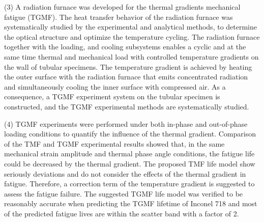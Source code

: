 (3) A radiation furnace was developed for the thermal gradients mechanical fatigue (TGMF). The heat transfer behavior of the radiation furnace was systematically studied by the experimental and analytical methods, to determine the optical structure and optimize the temperature cycling. The radiation furnace together with the loading, and cooling subsystems enables a cyclic and at the same time thermal and mechanical load with controlled temperature gradients on the wall of tubular specimens. The temperature gradient is achieved by heating the outer surface with the radiation furnace that emits concentrated radiation and simultaneously cooling the inner surface with compressed air. As a consequence, a TGMF experiment system on the tubular specimen is constructed, and the TGMF experimental methods are systematically studied. 

(4) TGMF experiments were performed under both in-phase and out-of-phase loading conditions to quantify the influence of the thermal gradient. Comparison of the TMF and TGMF experimental results showed that, in the same mechanical strain amplitude and thermal phase angle conditions, the fatigue life could be decreased by the thermal gradient. The proposed TMF life model show seriously deviations and do not consider the effects of the thermal gradient in fatigue. Therefore, a correction term of the temperature gradient is suggested to assess the fatigue failure. The suggested TGMF life model was verified to be reasonably accurate when predicting the TGMF lifetime of Inconel 718 and most of the predicted fatigue lives are within the scatter band with a factor of 2.